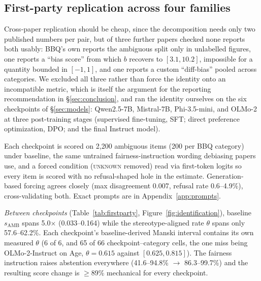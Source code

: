 \subsection{First-party replication across four families}
\label{sec:firstparty}

Cross-paper replication should be cheap, since the decomposition needs only two
published numbers per pair, but of three further papers checked none reports
both usably: BBQ's own reports the ambiguous split only in unlabelled
figures, one reports a ``bias score'' \citep{wu2025reasoning} from which $b$
recovers to $[3.1, 10.2]$, impossible for a quantity bounded in $[-1,1]$, and
one reports a custom ``diff-bias'' pooled across categories. We excluded all
three rather than force the identity onto an incompatible metric, which is
itself the argument for the reporting recommendation in
\S\ref{sec:conclusion}, and ran the identity ourselves on the six checkpoints
of \S\ref{sec:models}: Qwen2.5-7B, Mistral-7B, Phi-3.5-mini, and OLMo-2 at three
post-training stages (supervised fine-tuning, SFT; direct preference
optimization, DPO; and the final Instruct model).

Each checkpoint is scored on 2{,}200 ambiguous items (200 per BBQ category)
under baseline, the same untrained fairness-instruction wording debiasing
papers use, and a forced condition (\textsc{unknown} removed) read via
first-token logits so every item is scored with no refusal-shaped hole in the
estimate. Generation-based forcing agrees closely (max disagreement 0.007,
refusal rate 0.6--4.9\%), cross-validating both. Exact prompts are in
Appendix~\ref{app:prompts}.

\emph{Between checkpoints} (Table~\ref{tab:firstparty},
Figure~\ref{fig:identification}), baseline $s_{\text{AMB}}$ spans
5.0$\times$ (0.033--0.164) while the stereotype-aligned rate $\theta$ spans
only 57.6--62.2\%. Each checkpoint's baseline-derived Manski interval contains
its own measured $\theta$ (6 of 6, and 65 of 66 checkpoint--category cells, the one
miss being OLMo-2-Instruct on Age, $\theta=0.615$ against $[0.625, 0.815]$).
The fairness instruction raises abstention everywhere
(41.6--94.8\% $\to$ 86.3--99.7\%) and the resulting score change is
$\ge$89\% mechanical for every checkpoint.


